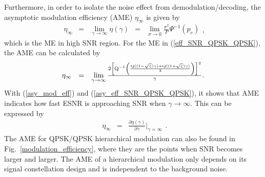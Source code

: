 \documentclass[conference]{IEEEtran}
\begin{document}
Furthermore, in order to isolate the noise effect from
demodulation/decoding, the asymptotic modulation efficiency (AME)
$\eta_{\infty}$ is given by
\begin{equation}
\begin{array}{rcccl}
\eta_{\infty}&=&\lim\limits_{\gamma\rightarrow\infty}\eta\left(\gamma\right)&=&\lim\limits_{\sigma\rightarrow0}\frac{\sigma^2}{P}\Psi^{-1}\left(p_{e}\right)
\end{array},\label{asy_mod_eff}
\end{equation}
\noindent which is the ME in high SNR region. For the ME in
(\ref{eff_SNR_QPSK_QPSK}), the AME can be calculated by
\begin{equation}%
\begin{array}{rcl}
\eta_{\infty}&=&\lim\limits_{\gamma\rightarrow\infty}\frac{2\left[{\rm
Q}^{-1}\left(\frac{{\rm Q}((1-\sqrt{\zeta})\gamma)+{\rm
Q}((1+\sqrt{\zeta})\gamma)}{2}\right)\right]^2}{\gamma}.
\end{array}\label{asy_eff_SNR_QPSK_QPSK}
\end{equation}
\noindent With (\ref{asy_mod_eff}) and
(\ref{asy_eff_SNR_QPSK_QPSK}), it shows that AME indicates how
fast ESNR is approaching SNR when $\gamma\rightarrow\infty$. This
can be expressed by
\begin{equation}
\begin{array}{rcl}
\eta_{\infty}&=&\frac{\partial\eta\left(\gamma\right)}{\partial\gamma}|_{\gamma=\infty}
\end{array}.\label{asy_mod_eff2}
\end{equation}
\noindent The AME for QPSK/QPSK hierarchical modulation can also
be found in Fig.~\ref{modulation_efficiency}, where they are the
points when SNR becomes larger and larger. The AME of a
hierarchical modulation only depends on its signal constellation
design and is independent to the background noise.
\end{document}
